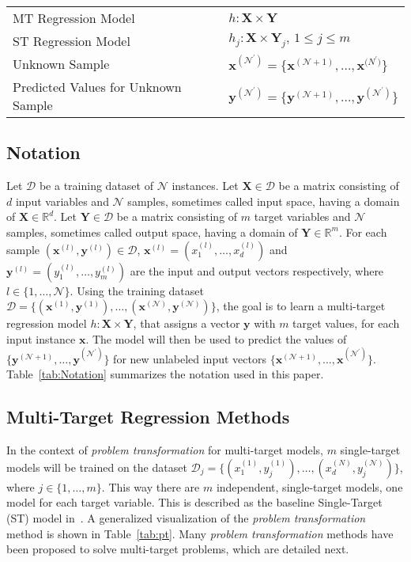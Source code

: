 \documentclass[preprint,12pt]{elsarticle}
\begin{document}
\begin{table*}[b!]
\begin{threeparttable}
{\begin{tabular}{ll}
MT Regression Model & $h : \bm{X} \times \bm{Y}$ \\
ST Regression Model & $h_j : \bm{X} \times \bm{Y}_j,\, 1 \leq j \leq m$ \\
Unknown Sample & $\bm{x}^{(\mathcal N^\prime)} = \{\bm {x}^{(\mathcal N+1)}, \ldots, \bm {x}^{\mathcal (N^\prime)}\}$ \\
Predicted Values for Unknown Sample & $\bm{y}^{(\mathcal N^\prime)} = \{\bm{y}^{(\mathcal N+1)}, \ldots, \bm {y}^{(\mathcal N^\prime)}\}$\\
\bottomrule
\end{tabular}}
\end{threeparttable}
\label{tab:Notation}
\bigskip
\end{table*}

\subsection{Notation}\label{subsec:notation}
Let $\mathcal{D}$ be a training dataset of $\mathcal{N}$ instances. Let $\bm{X} \in \mathcal{D}$ be a matrix consisting of $d$ input variables and $\mathcal{N}$ samples, sometimes called input space, having a domain of $\bm{X} \in \mathbb{R}^d$. Let $\bm{Y} \in \mathcal{D}$ be a matrix consisting of $m$ target variables and $\mathcal{N}$ samples, sometimes called output space, having a domain of $\bm{Y} \in \mathbb{R}^m$. For each sample $(\bm x^{(l)},\bm y^{(l)}) \in \mathcal{D}$, $\bm{x}^{(l)} = (x_1^{(l)}, \ldots, x_d^{(l)})$ and $\bm y^{(l)} = (y_1^{(l)}, \ldots, y_m^{(l)})$ are the input and output vectors respectively, where $l \in \{1, \ldots, \mathcal{N}\}$. Using the training dataset $\mathcal{D} = \{(\bm x^{(1)},\bm y^{(1)}), \ldots, (\bm x^{(\mathcal{N})},\bm y^{(\mathcal{N})})\}$, the goal is to learn a multi-target regression model $h : \bm{X} \times \bm{Y}$, that assigns a vector $\bm{y}$ with $m$ target values, for each input instance $\bm{x}$. The model will then be used to predict the values of $\{\bm{y}^{(\mathcal{N}+1)}, \ldots, \bm{y}^{(\mathcal{N}^\prime)}\}$ for new unlabeled input vectors $\{\bm{x}^{(\mathcal{N}+1)}, \ldots, \bm{x}^{(\mathcal{N}^\prime)}\}$. Table~\ref{tab:Notation} summarizes the notation used in this paper.



\subsection{Multi-Target Regression Methods}\label{subsec:mtr}
In the context of \textit{problem transformation} for multi-target models, $m$ single-target models will be trained on the dataset $\mathcal{D}_j = \{(x_1^{(1)},y_j^{(1)}), \ldots, (x_d^{(N)},y_j^{(\mathcal{N})})\}$, where $j \in \{1, \ldots, m\}$. This way there are $m$ independent, single-target models, one model for each target variable. This is described as the baseline Single-Target (ST) model in~\cite{Spyromitros2014}. A generalized visualization of the \textit{problem transformation} method is shown in Table~\ref{tab:pt}. Many \textit{problem transformation} methods have been proposed to solve multi-target problems, which are detailed next.
\end{document}
